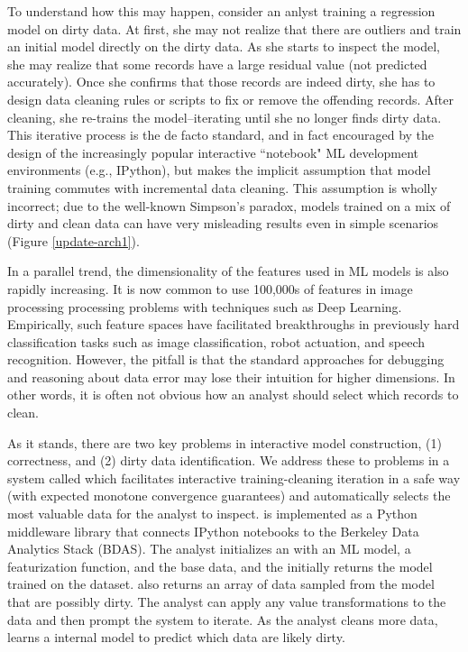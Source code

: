 To understand how this may happen, consider an anlyst training a regression model on dirty data. At first, she may not realize that there are outliers and train an initial model directly on the dirty data. As she starts to inspect the model, she may realize that some records have a large residual value (not predicted accurately). Once she confirms that those records are indeed dirty, she has to design data cleaning rules or scripts to fix or remove the offending records. After cleaning, she re-trains the model--iterating until she no longer finds dirty data.
This iterative process is the de facto standard, and in fact encouraged by the design of the increasingly popular interactive ``notebook" ML development environments (e.g., IPython), but makes the implicit assumption that model training commutes with incremental data cleaning.
This assumption is wholly incorrect; due to the well-known Simpson's paradox, models trained on a mix of dirty and clean data can have very misleading results even in simple scenarios (Figure \ref{update-arch1}).

In a parallel trend, the dimensionality of the features used in ML models is also rapidly increasing. 
It is now common to use 100,000s of features in image processing processing problems with techniques such as Deep Learning.
Empirically, such feature spaces have facilitated breakthroughs in previously hard classification tasks such as image classification, robot actuation, and speech recognition.
However, the pitfall is that the standard approaches for debugging and reasoning about data error may lose their intuition for higher dimensions.
In other words, it is often not obvious how an analyst should select which records to clean.

As it stands, there are two key problems in interactive model construction, (1) correctness, and (2) dirty data identification.
We address these to problems in a system called \sys which facilitates interactive training-cleaning iteration in a safe way (with expected monotone convergence guarantees) and automatically selects the most valuable data for the analyst to inspect.
\sys is implemented as a Python middleware library that connects IPython notebooks to the Berkeley Data Analytics Stack (BDAS).
The analyst initializes an \sys with an ML model, a featurization function, and the base data, and the \sys initially returns the model trained on the dataset.
\sys also returns an array of data sampled from the model that are possibly dirty.
The analyst can apply any value transformations to the data and then prompt the system to iterate. 
As the analyst cleans more data, \sys learns a internal model to predict which data are likely dirty.

